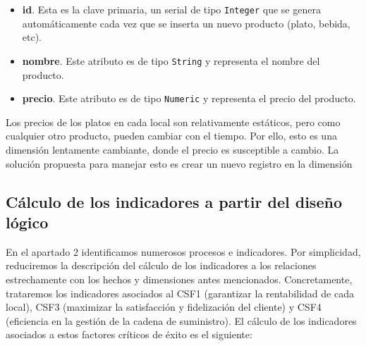 \documentclass[12pt]{opticajnl}
\begin{document}
\begin{itemize}
\begin{itemize}
\item \textbf{id}. Esta es la clave primaria, un serial de tipo \texttt{Integer} que se genera automáticamente cada vez que se inserta un nuevo producto (plato, bebida, etc).
\item \textbf{nombre}. Este atributo es de tipo \texttt{String} y representa el nombre del producto.
\item \textbf{precio}. Este atributo es de tipo \texttt{Numeric} y representa el precio del producto.
\end{itemize}
Los precios de los platos en cada local son relativamente estáticos, pero como cualquier otro producto, pueden cambiar con el tiempo. Por ello, esto es una dimensión lentamente cambiante, donde el precio es susceptible a cambio. La solución propuesta para manejar esto es crear un nuevo registro en la dimensión
\end{itemize}


\subsection{Cálculo de los indicadores a partir del diseño lógico} \label{sec:3c}

En el apartado 2 identificamos numerosos procesos e indicadores. Por simplicidad, reduciremos la descripción del cálculo de los indicadores a los relaciones estrechamente con los hechos y dimensiones antes mencionados. Concretamente, trataremos los indicadores asociados al CSF1 (garantizar la rentabilidad de cada local), CSF3 (maximizar la satisfacción y fidelización del cliente) y CSF4 (eficiencia en la gestión de la cadena de suministro). El cálculo de los indicadores asociados a estos factores críticos de éxito es el siguiente:
\end{document}
